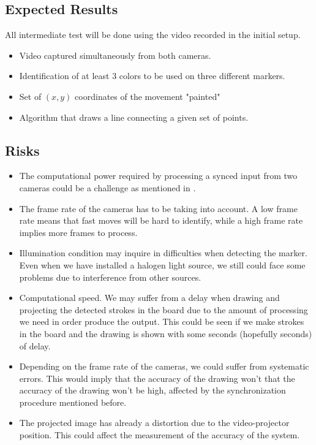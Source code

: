 \documentclass[a4paper,12pt]{article}
\begin{document}
\subsection*{Expected Results}

All intermediate test will be done using the video recorded in the initial setup. 
\begin{itemize}
\item Video captured simultaneously from both cameras. 
\item Identification of at least 3 colors to be used on three different markers.
\item Set of $(x,y)$ coordinates of the movement "painted"
\item Algorithm that draws a line connecting a given set of points.
\end{itemize}
\subsection*{Risks}
\begin{itemize}
\item The computational power required by processing a synced input from two cameras could be a challenge as mentioned in \cite{martin}.
\item The frame rate of the cameras has to be taking into account. A low frame rate means that fast moves will be hard to identify, while a high frame rate implies more frames to process.
\item Illumination condition may inquire in difficulties when detecting the marker. Even when we have installed a halogen light source, we still could face some problems due to interference from other sources.
\item Computational speed. We may suffer from a delay when drawing and projecting the detected strokes in the board due to the amount of processing we need in order produce the output. This could be seen if we make strokes in the board and the drawing is shown with some seconds (hopefully seconds) of delay.
\item Depending on the frame rate of the cameras, we could suffer from systematic errors. This would imply that the accuracy of the drawing won't that the accuracy of the drawing won't be high, affected by the synchronization procedure mentioned before.
\item The projected image has already a distortion due to the video-projector position. This could affect the measurement of the accuracy of the system.
\end{itemize}
\end{document}
